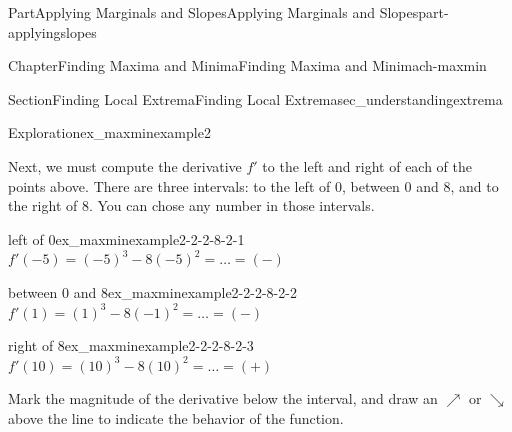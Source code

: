 \documentclass[oneside,10pt,]{tufte-book}
\numberwithin{equation}{chapter}
\begin{document}
\begin{partptx}{Part}{Applying Marginals and Slopes}{}{Applying Marginals and Slopes}{}{}{part-applyingslopes}
\begin{chapterptx}{Chapter}{Finding Maxima and Minima}{}{Finding Maxima and Minima}{}{}{ch-maxmin}
\begin{sectionptx}{Section}{Finding Local Extrema}{}{Finding Local Extrema}{}{}{sec_understandingextrema}
\begin{exploration}{Exploration}{}{ex_maxminexample2}
\begin{enumerate}[font=\bfseries,label=(\alph*),ref=\alph*]
\begin{image}{0.3}{0.4}{0.3}{}%
%
\end{image}%
%
\par
Next, we must compute the derivative \(f'\) to the left and right of each of the points above. There are three intervals: to the left of 0, between 0 and 8, and to the right of 8. You can chose any number in those intervals.%
\begin{descriptionlist}
\begin{dlimedium}{left of 0}{ex_maxminexample2-2-2-8-2-1}%
 \(f'(-5) = (-5)^3 - 8(-5)^2 = \dots = (-)\)\end{dlimedium}%
\begin{dlimedium}{between 0 and 8}{ex_maxminexample2-2-2-8-2-2}%
 \(f'(1) = (1)^3 - 8(-1)^2 = \dots = (-)\)\end{dlimedium}%
\begin{dlimedium}{right of 8}{ex_maxminexample2-2-2-8-2-3}%
 \(f'(10) = (10)^3 - 8(10)^2 = \dots = (+)\)\end{dlimedium}%
\end{descriptionlist}
Mark the magnitude of the derivative below the interval, and draw an \(\nearrow\) or \(\searrow\) above the line to indicate the behavior of the function.%
\par
\begin{image}{0.25}{0.5}{0.25}{}%
\end{image}
\end{enumerate}
\end{exploration}
\end{sectionptx}
\end{chapterptx}
\end{partptx}
\end{document}
